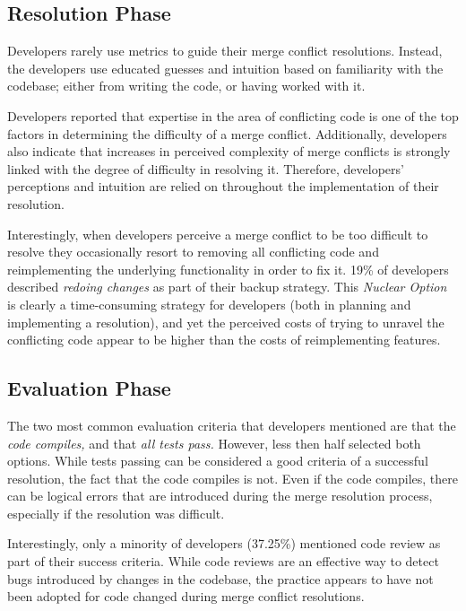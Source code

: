 \subsection{Resolution Phase}

Developers rarely use metrics to guide their merge conflict resolutions.
Instead, the developers use educated guesses and intuition based on familiarity with the codebase; either from writing the code, or having worked with it.

Developers reported that expertise in the area of conflicting code is one of the top factors in determining the difficulty of a merge conflict.
Additionally, developers also indicate that increases in perceived complexity of merge conflicts is strongly linked with the degree of difficulty in resolving it.
Therefore, developers' perceptions and intuition are relied on throughout the implementation of their resolution.

Interestingly, when developers perceive a merge conflict to be too difficult to resolve they occasionally resort to removing all conflicting code and reimplementing the underlying functionality in order to fix it.
19\% of developers described \textit{redoing changes} as part of their backup strategy.
This \textit{Nuclear Option} is clearly a time-consuming strategy for developers (both in planning and implementing a resolution), and yet the perceived costs of trying to unravel the conflicting code appear to be higher than the costs of reimplementing features.

\subsection{Evaluation Phase}

The two most common evaluation criteria that developers mentioned are that the \emph{code compiles,} and that \emph{all tests pass.}
However, less then half selected both options.
While tests passing can be considered a good criteria of a successful resolution, the fact that the code compiles is not.
Even if the code compiles, there can be logical errors that are introduced during the merge resolution process, especially if the resolution was difficult.

Interestingly, only a minority of developers (37.25\%) mentioned code review as part of their success criteria.
While code reviews are an effective way to detect bugs introduced by changes in the codebase, the practice appears to have not been adopted for code changed during merge conflict resolutions.

